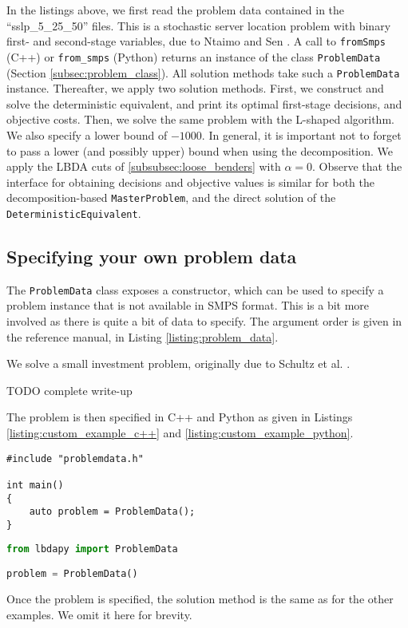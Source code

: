 \documentclass[12pt, english]{article}
\begin{document}
In the listings above, we first read the problem data contained in the ``sslp\_5\_25\_50'' files. This is a stochastic server location problem with binary first- and second-stage variables, due to Ntaimo and Sen \cite{ntaimo2005}.  A call to \texttt{fromSmps} (C++) or \texttt{from\_smps} (Python) returns an instance of the class \texttt{ProblemData} (Section \ref{subsec:problem_class}). All solution methods take such a \texttt{ProblemData} instance. Thereafter, we apply two solution methods. First, we construct and solve the deterministic equivalent, and print its optimal first-stage decisions, and objective costs. Then, we solve the same problem with the L-shaped algorithm. We also specify a lower bound of $-1000$. In general, it is important not to forget to pass a lower (and possibly upper) bound when using the decomposition. We apply the LBDA cuts of \ref{subsubsec:loose_benders} with $\alpha = 0$. Observe that the interface for obtaining decisions and objective values is similar for both the decomposition-based \texttt{MasterProblem}, and the direct solution of the \texttt{DeterministicEquivalent}.

\subsection{Specifying your own problem data}
\label{subsec:own_data_example}

The \texttt{ProblemData} class exposes a constructor, which can be used to specify a problem instance that is not available in SMPS format. This is a bit more involved as there is quite a bit of data to specify. The argument order is given in the reference manual, in Listing \ref{listing:problem_data}.

We solve a small investment problem, originally due to Schultz et al. \cite{schultz1998}. 

TODO complete write-up

The problem is then specified in C++ and Python as given in Listings \ref{listing:custom_example_c++} and \ref{listing:custom_example_python}.

\begin{lstlisting}[caption={Specifying a custom problem in C++.},
label={listing:custom_example_c++}]
#include "problemdata.h"

int main()
{
	auto problem = ProblemData();
}
\end{lstlisting}
\begin{lstlisting}[caption={Specifying a custom problem in Python.},
label={listing:custom_example_python},
language={Python}]
from lbdapy import ProblemData

problem = ProblemData()
\end{lstlisting}
Once the problem is specified, the solution method is the same as for the other examples. We omit it here for brevity.
\end{document}
